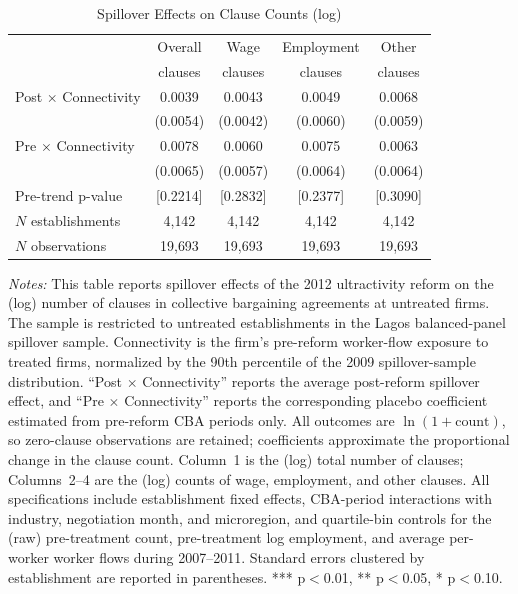 \begin{table}[!htbp]
\centering
\caption{Spillover Effects on Clause Counts (log)}
\label{tab:clause_count_log_spill}
\scriptsize
\begin{tabular}{lcccc}
\toprule
 & Overall & Wage & Employment & Other \\
 & clauses & clauses & clauses & clauses \\
\midrule
Post $\times$ Connectivity & 0.0039 & 0.0043 & 0.0049 & 0.0068\\
 & (0.0054) & (0.0042) & (0.0060) & (0.0059)\\
Pre $\times$ Connectivity & 0.0078 & 0.0060 & 0.0075 & 0.0063\\
 & (0.0065) & (0.0057) & (0.0064) & (0.0064)\\
Pre-trend p-value & [0.2214] & [0.2832] & [0.2377] & [0.3090]\\
$N$ establishments & 4{,}142 & 4{,}142 & 4{,}142 & 4{,}142\\
$N$ observations & 19{,}693 & 19{,}693 & 19{,}693 & 19{,}693\\
\bottomrule
\end{tabular}
\begin{minipage}{\linewidth}
\footnotesize\vspace{4pt}
\textit{Notes:} This table reports spillover effects of the 2012 ultractivity reform on the (log) number of clauses in collective bargaining agreements at untreated firms. The sample is restricted to untreated establishments in the Lagos balanced-panel spillover sample. Connectivity is the firm's pre-reform worker-flow exposure to treated firms, normalized by the 90th percentile of the 2009 spillover-sample distribution. ``Post $\times$ Connectivity'' reports the average post-reform spillover effect, and ``Pre $\times$ Connectivity'' reports the corresponding placebo coefficient estimated from pre-reform CBA periods only. All outcomes are $\ln(1 + \text{count})$, so zero-clause observations are retained; coefficients approximate the proportional change in the clause count. Column~1 is the (log) total number of clauses; Columns~2--4 are the (log) counts of wage, employment, and other clauses. All specifications include establishment fixed effects, CBA-period interactions with industry, negotiation month, and microregion, and quartile-bin controls for the (raw) pre-treatment count, pre-treatment log employment, and average per-worker worker flows during 2007--2011. Standard errors clustered by establishment are reported in parentheses. *** p$<$0.01, ** p$<$0.05, * p$<$0.10.
\end{minipage}
\end{table}
